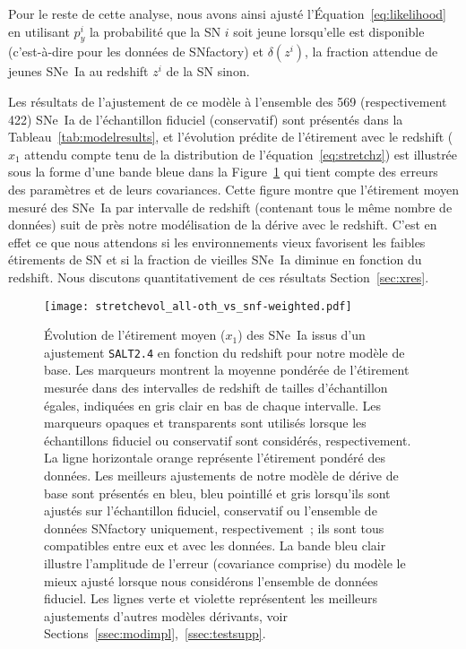 \documentclass[../main/main.tex]{subfiles}
\begin{document}
Pour le reste de cette analyse, nous avons ainsi ajusté
l'Équation~\ref{eq:likelihood} en utilisant $p_y^i$ la probabilité que la SN $i$
soit jeune lorsqu'elle est disponible (c'est-à-dire pour les données de
SNfactory) et $\delta(z^i)$, la fraction attendue de jeunes SNe~Ia au redshift
$z^i$ de la SN sinon.\bigbreak

Les résultats de l'ajustement de ce modèle à l'ensemble des 569 (respectivement
422) SNe~Ia de l'échantillon fiduciel (conservatif) sont présentés dans la
Tableau~\ref{tab:modelresults}, et l'évolution prédite de l'étirement avec le
redshift ($x_1$ attendu compte tenu de la distribution de
l'équation~\ref{eq:stretchz}) est illustrée sous la forme d'une bande bleue dans
la Figure~\ref{fig:evol_all} qui tient compte des erreurs des paramètres et de
leurs covariances. Cette figure montre que l'étirement moyen mesuré des SNe~Ia
par intervalle de redshift (contenant tous le même nombre de données) suit de
près notre modélisation de la dérive avec le redshift. C'est en effet ce que
nous attendons si les environnements vieux favorisent les faibles étirements de SN
\citep[voir par exemple][]{howell2007} et si la fraction de vieilles SNe~Ia
diminue en fonction du redshift. Nous discutons quantitativement de ces
résultats Section~\ref{sec:xres}.

\begin{figure}
    \texttt{[image: stretchevol\_all-oth\_vs\_snf-weighted.pdf]}
    \caption[Évolution de l'étirement moyen des SNe~Ia en fonction du redshift
    issu de la prédiction de notre modèle de base selon l'échantillon
    utilisé]{Évolution de l'étirement moyen ($x_1$) des SNe~Ia issus d'un
        ajustement \texttt{SALT2.4} en fonction du redshift pour notre modèle de
        base. Les marqueurs montrent la moyenne pondérée de l'étirement mesurée
        dans des intervalles de redshift de tailles d'échantillon égales,
        indiquées en gris clair en bas de chaque intervalle. Les marqueurs
        opaques et transparents sont utilisés lorsque les échantillons fiduciel
        ou conservatif sont considérés, respectivement. La ligne horizontale
        orange représente l'étirement pondéré des données. Les meilleurs
        ajustements de notre modèle de dérive de base sont présentés en bleu,
        bleu pointillé et gris lorsqu'ils sont ajustés sur l'échantillon
        fiduciel, conservatif ou l'ensemble de données SNfactory uniquement,
        respectivement~; ils sont tous compatibles entre eux et avec les
        données. La bande bleu clair illustre l'amplitude de l'erreur
        (covariance comprise) du modèle le mieux ajusté lorsque nous considérons
        l'ensemble de données fiduciel. Les lignes verte et violette
        représentent les meilleurs ajustements d'autres modèles dérivants, voir
    Sections~\ref{ssec:modimpl},~\ref{ssec:testsupp}.}
    \label{fig:evol_all}
\end{figure}
\end{document}
